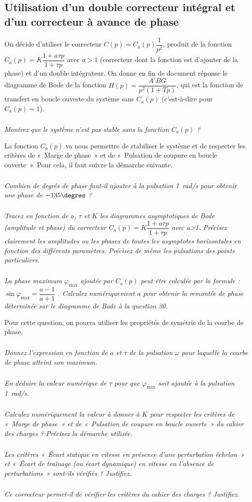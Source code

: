 \documentclass[10pt,fleqn]{article} %
\begin{document}
\subsection{Utilisation d’un double correcteur intégral et d’un correcteur à avance de phase}


On décide d’utiliser le correcteur $C(p)=C_a(p)\dfrac{1}{p^2}$, produit de la fonction $C_a(p)=K\dfrac{1+a\tau p}{1+\tau p}$  avec $a>1$ (correcteur dont la fonction est d’ajouter de la phase) et d’un double intégrateur.
	On donne en fin de document réponse le diagramme de Bode de la fonction $H(p)=\dfrac{A'BG}{p^2\left(1+T p\right)}$, qui est la fonction de transfert en boucle ouverte du système sans $C_a(p)$   (c’est-à-dire pour $C_a(p)=1$).



\subparagraph{}
\textit{Montrez que le système n’est pas stable sans la fonction  $C_a(p)$ ?}

	La fonction $C_a(p)$ va nous permettre de stabiliser le système et de respecter les critères de «~Marge de phase~» et de «~Pulsation de coupure en boucle ouverte~». Pour cela, il faut suivre la démarche suivante.

\subparagraph{}
\textit{Combien de degrés de phase faut-il ajouter à la pulsation \SI{1}{rad/s} pour obtenir une phase de $-135\degres$ ?}

\subparagraph{}
\textit{Tracez en fonction de $a$, $\tau$ et $K$ les diagrammes asymptotiques de Bode (amplitude et phase) du correcteur $C_a(p)=K\dfrac{1+a\tau p}{1+\tau p}$  avec a>1. Précisez clairement les amplitudes ou les phases de toutes les asymptotes horizontales en fonction des différents paramètres. Précisez de même les pulsations des points particuliers.}

\subparagraph{}
\textit{La phase maximum $\varphi_{\text{max}}$ ajoutée par $C_a(p)$ peut être calculée par la formule : $\sin \varphi_{\text{max}}=\dfrac{a-1}{a+1}$ . Calculez numériquement $a$ pour obtenir la remontée de phase déterminée sur le diagramme de Bode à la question 30.}

Pour cette question, on pourra utiliser les propriétés de symétrie de la courbe de phase. 

\subparagraph{}
\textit{Donnez l’expression en fonction de $a$ et $\tau$ de la pulsation $\omega$ pour laquelle la courbe de phase atteint son maximum.}

\subparagraph{}
\textit{En déduire la valeur numérique de $\tau$ pour que $\varphi_{\text{max}}$ soit ajoutée à la pulsation \SI{1}{rad/s}.}

\subparagraph{}
\textit{Calculez numériquement la valeur à donner à $K$ pour respecter les critères de «~Marge de phase~» et de «~Pulsation de coupure en boucle ouverte~» du cahier des charges ? Précisez la démarche utilisée.}

\subparagraph{}
\textit{Les critères «~Écart statique en vitesse en présence d’une perturbation échelon~» et  «~Écart de traînage (ou écart dynamique) en vitesse en l’absence de perturbations~» sont-ils vérifiés ? Justifiez.}

\subparagraph{}
\textit{Ce correcteur permet-il de vérifier les critères du cahier des charges ? Justifiez.}
\end{document}
